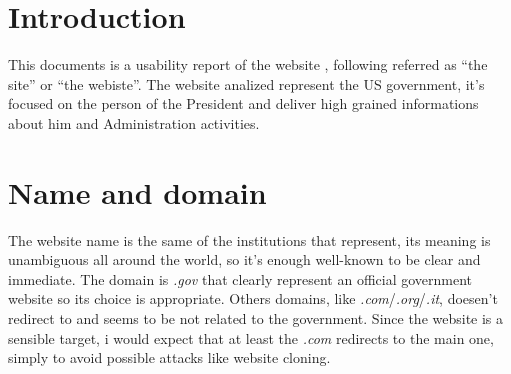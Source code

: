 \documentclass[
12pt, %
a4paper, %
oneside, %
headinclude,footinclude, %
BCOR5mm, %
]{scrartcl}
\begin{document}


{\let\thefootnote\relax{}}


\newpage %


\section{Introduction}
	This documents is a usability report of the website \thesite{}, following referred as ``the site'' or ``the webiste''. The website analized represent the US government, it's focused on the person of the President and deliver high grained informations about him and Administration activities.  
 

\section{Name and domain}

The website name is the same of the institutions that represent, its meaning is unambiguous all around the world, so it's enough well-known to be clear and immediate. The domain is \emph{.gov} that clearly represent an official government website so its choice is appropriate. Others domains, like \emph{.com}/\emph{.org}/\emph{.it}, doesen't redirect to \thesite{} and seems to be not related to the government. Since the website is a sensible target, i would expect that at least the \emph{.com} redirects to the main one, simply to avoid possible attacks like website cloning.
\end{document}
